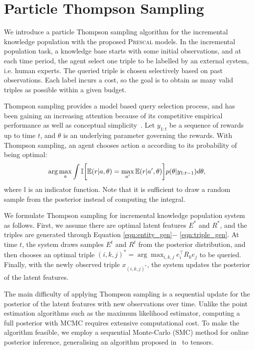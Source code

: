 \section{Particle Thompson Sampling}
\label{sec:pts}

We introduce a particle Thompson sampling algorithm for the incremental knowledge population with the proposed \textsc{Prescal} models. In the incremental population task, a knowledge base starts with some initial observations, and at each time period, the agent select one triple to be labelled by an external system, i.e. human experts. The queried triple is chosen selectively based on past observations. Each label incurs a cost, so the goal is to obtain as many valid triples as possible within a given budget.

Thompson sampling provides a model based query selection process, and has been gaining an increasing attention
because of its competitive empirical performance as well as conceptual
simplicity~\cite{li11thompson,scott10bandit}. Let $y_{1:t}$ be a sequence of rewards up to time $t$, and $\theta$ is an underlying parameter governing the rewards. With Thompson sampling, an agent chooses action $a$ according to its probability of being optimal:
\begin{align}
\arg\max_a \int \mathbb{I}\bigg[ \mathbb{E}(r|a, \theta)
= \max_{a'}\mathbb{E}(r|a',\theta) \bigg] p(\theta|y_{1:t-1}) d\theta, \notag
\end{align}
where $\mathbb{I}$ is an indicator function. Note that it is sufficient
to draw a random sample from the posterior instead of computing the integral.

We formulate Thompson sampling for incremental knowledge population
system as follows.
First, we assume there are optimal latent features $E^*$ and $R^*$, and
the triples are generated through Equation \ref{eqn:entity_gen}$-$
\ref{eqn:triple_gen}. At time $t$, the system draws samples $E^t$ and $R^t$
from the posterior distribution, and then chooses an optimal triple $(i,k,j)^*
= \arg\max_{i,k,j} e_i^\top R_k e_j$ to be queried. Finally, with the newly
observed triple $x_{(i,k,j)^*}$, the system updates the posterior of the latent
features.

The main difficulty of applying Thompson sampling is a sequential update for the posterior of the latent features with new observations over time. Unlike the point estimation algorithms such as
the maximum likelihood estimator, computing a full posterior with MCMC
requires extensive computational cost. To make the algorithm feasible, we employ a sequential Monte-Carlo (SMC) method for online posterior inference, generalising an algorithm proposed
in~\cite{kawale2015efficient} to tensors.

